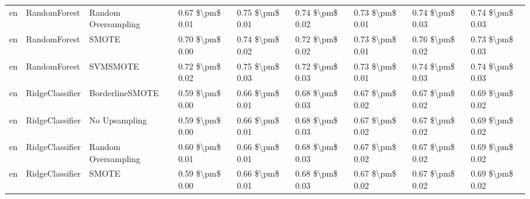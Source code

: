 \begin{tabular}{lllllllll}
      en &                    RandomForest &           Random Oversampling & 0.67 \$\textbackslash pm\$ 0.01 &           0.75 \$\textbackslash pm\$ 0.01 &       0.74 \$\textbackslash pm\$ 0.02 &        0.73 \$\textbackslash pm\$ 0.01 &                         0.74 \$\textbackslash pm\$ 0.03 &     0.74 \$\textbackslash pm\$ 0.03 \\
      en &                    RandomForest &                         SMOTE & 0.70 \$\textbackslash pm\$ 0.00 &           0.74 \$\textbackslash pm\$ 0.02 &       0.72 \$\textbackslash pm\$ 0.02 &        0.73 \$\textbackslash pm\$ 0.01 &                         0.76 \$\textbackslash pm\$ 0.02 &     0.73 \$\textbackslash pm\$ 0.03 \\
      en &                    RandomForest &                      SVMSMOTE & 0.72 \$\textbackslash pm\$ 0.02 &           0.75 \$\textbackslash pm\$ 0.03 &       0.72 \$\textbackslash pm\$ 0.03 &        0.73 \$\textbackslash pm\$ 0.01 &                         0.74 \$\textbackslash pm\$ 0.03 &     0.74 \$\textbackslash pm\$ 0.03 \\
      en &                 RidgeClassifier &               BorderlineSMOTE & 0.59 \$\textbackslash pm\$ 0.00 &           0.66 \$\textbackslash pm\$ 0.01 &       0.68 \$\textbackslash pm\$ 0.03 &        0.67 \$\textbackslash pm\$ 0.02 &                         0.67 \$\textbackslash pm\$ 0.02 &     0.69 \$\textbackslash pm\$ 0.02 \\
      en &                 RidgeClassifier &                 No Upsampling & 0.59 \$\textbackslash pm\$ 0.00 &           0.66 \$\textbackslash pm\$ 0.01 &       0.68 \$\textbackslash pm\$ 0.03 &        0.67 \$\textbackslash pm\$ 0.02 &                         0.67 \$\textbackslash pm\$ 0.02 &     0.69 \$\textbackslash pm\$ 0.02 \\
      en &                 RidgeClassifier &           Random Oversampling & 0.60 \$\textbackslash pm\$ 0.01 &           0.66 \$\textbackslash pm\$ 0.01 &       0.68 \$\textbackslash pm\$ 0.03 &        0.67 \$\textbackslash pm\$ 0.02 &                         0.67 \$\textbackslash pm\$ 0.02 &     0.69 \$\textbackslash pm\$ 0.02 \\
      en &                 RidgeClassifier &                         SMOTE & 0.59 \$\textbackslash pm\$ 0.00 &           0.66 \$\textbackslash pm\$ 0.01 &       0.68 \$\textbackslash pm\$ 0.03 &        0.67 \$\textbackslash pm\$ 0.02 &                         0.67 \$\textbackslash pm\$ 0.02 &     0.69 \$\textbackslash pm\$ 0.02 \\

\end{tabular}
